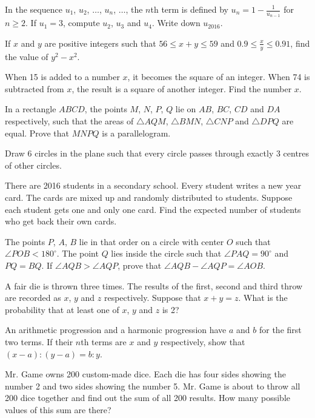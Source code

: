 \begin{problems}
    \problem In the sequence $u_{1}$, $u_{2}$, $\ldots$, $u_{n}$, $\ldots$, the
    $n$th term is defined by $u_{n} = 1 - \frac{1}{u_{n - 1}}$ for $n \geq 2$.
    If $u_{1} = 3$, compute $u_{2}$, $u_{3}$ and $u_{4}$. Write down
    $u_{2016}$.  
    
    \problem If $x$ and $y$ are positive integers such that $56 \leq x + y \leq
    59$ and $0.9 \leq \frac{x}{y} \leq 0.91$, find the value of $y^2 - x^2$. 
    
    \problem When 15 is added to a number $x$, it becomes the square of an
    integer. When 74 is subtracted from $x$, the result is a square of another
    integer. Find the number $x$. 
    
    \problem In a rectangle $ABCD$, the points $M$, $N$, $P$, $Q$ lie on $AB$,
    $BC$, $CD$ and $DA$ respectively, such that the areas of $\triangle AQM$,
    $\triangle BMN$, $\triangle CNP$ and $\triangle DPQ$ are equal. Prove that
    $MNPQ$ is a parallelogram.
    
    \problem Draw 6 circles in the plane such that every circle passes through
    exactly 3 centres of other circles. 
    
    \problem There are 2016 students in a secondary school. Every student
    writes a new year card. The cards are mixed up and randomly distributed to
    students. Suppose each student gets one and only one card. Find the
    expected number of students who get back their own cards. 
    
    \problem The points $P$, $A$, $B$ lie in that order on a circle with center
    $O$ such that $\angle POB < 180^\circ$. The point $Q$ lies inside the
    circle such that $\angle PAQ = 90^\circ$ and $PQ = BQ$. If $\angle AQB >
    \angle AQP$, prove that $\angle AQB - \angle AQP = \angle AOB$. 
    
    \problem A fair die is thrown three times. The results of the first, second
    and third throw are recorded as $x$, $y$ and $z$ respectively. Suppose that
    $x + y = z$. What is the probability that at least one of $x$, $y$ and $z$
    is 2?
    
    \problem An arithmetic progression and a harmonic progression have $a$ and
    $b$ for the first two terms. If their $n$th terms are $x$ and $y$
    respectively, show that $(x - a) : (y - a) = b : y$. 
    
    \problem Mr. Game owns 200 custom-made dice. Each die has four sides
    showing the number 2 and two sides showing the number 5. Mr. Game is about
    to throw all 200 dice together and find out the sum of all 200 results. How
    many possible values of this sum are there?
    

\end{problems}
